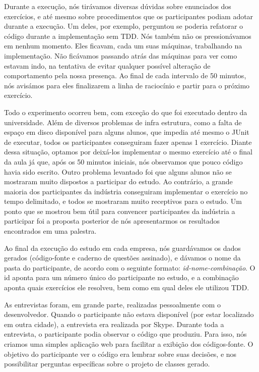 Durante a execução, nós tirávamos diversas dúvidas sobre enunciados dos
exercícios, e até mesmo sobre procedimentos que os participantes podiam
adotar durante a execução. Um deles, por exemplo, perguntou se poderia
refatorar o código durante a implementação sem TDD. 
Nós também não os pressionávamos em nenhum momento. Eles ficavam,
cada um suas máquinas, trabalhando na implementação. Não ficávamos 
passando atrás das máquinas para ver como estavam indo, na tentativa
de evitar qualquer possível alteração de comportamento pela nossa presença.
Ao final de cada intervalo de 50 minutos, nós avisámos para eles finalizarem
a linha de raciocínio e partir para o próximo exercício.

Todo o experimento ocorreu bem, com exceção do que foi executado
dentro da universidade. Além de diversos problemas de infra estrutura,
como a falta de espaço em disco disponível para alguns alunos, que impedia até mesmo
o JUnit de executar, todos os participantes conseguiram fazer apenas
1 exercício. Diante dessa situação, optamos por deixá-los implementar
o mesmo exercício até o final da aula já que, após os 50 minutos iniciais,
nós observamos que pouco código havia sido escrito. Outro problema levantado
foi que alguns alunos não se mostraram muito dispostos a participar
do estudo.
Ao contrário, a grande maioria dos participantes da indústria conseguiram
implementar o exercício no tempo delimitado, e todos se mostraram
muito receptivos para o estudo. Um ponto que se mostrou bem útil
para convencer participantes da indústria a participar foi a proposta
posterior de nós apresentarmos os resultados encontrados em uma palestra.

Ao final da execução do estudo em cada empresa, nós guardávamos
os dados gerados (código-fonte e caderno de questões assinado),
e dávamos o nome da pasta do participante, de acordo com
o seguinte formato: \textit{id-nome-combinação}. O id aponta
para um número único do participante no estudo, e a combinação
aponta quais exercícios ele resolveu, bem como em qual deles
ele utilizou TDD.

As entrevistas foram, em grande parte, realizadas pessoalmente com 
o desenvolvedor. Quando o participante não estava disponível (por estar
localizado em outra cidade), a entrevista era realizada por Skype.
Durante toda a entrevista, o participante podia observar o código que
produziu. Para isso, nós criamos uma simples aplicação web para facilitar
a exibição dos códigos-fonte. O objetivo do participante ver o código
era lembrar sobre suas decisões, e nos possibilitar perguntas específicas
sobre o projeto de classes gerado.

